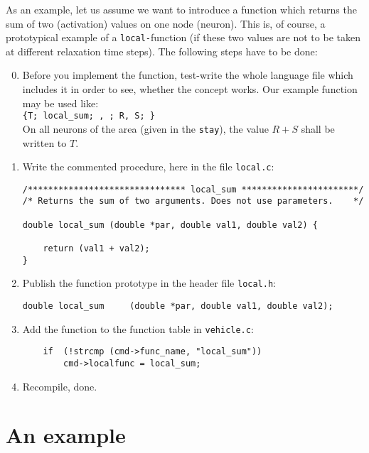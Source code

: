 \documentclass[12pt]{article}
\begin{document}
 As an example, let us assume we want to introduce a function which returns the sum of two (activation) values on one node (neuron).
 This is, of course, a prototypical example of a \texttt{local-}function
 (if these two values are not to be taken at different relaxation time steps).
 The following steps have to be done:

 \begin{enumerate}
 \setcounter{enumi}{-1}
 \item Before you implement the function,
 test-write the whole language file which includes it in order to see, whether the concept works.
 Our example function may be used like: \\
 \hspace*{11mm} \texttt{\{T; local\_sum; , ; R, S; \}} \\
 On all neurons of the area (given in the \texttt{stay}), the value $R + S$ shall be written to $T$.

 \item Write the commented procedure, here in the file \texttt{local.c}:
 \begin{verbatim}
/******************************* local_sum ***********************/
/* Returns the sum of two arguments. Does not use parameters.    */

double local_sum (double *par, double val1, double val2) {

    return (val1 + val2);
}
 \end{verbatim}

 \item Publish the function prototype in the header file \texttt{local.h}:
 \begin{verbatim}
double local_sum     (double *par, double val1, double val2);
 \end{verbatim}

 \item Add the function to the function table in \texttt{vehicle.c}:
 \begin{verbatim}
    if  (!strcmp (cmd->func_name, "local_sum"))
        cmd->localfunc = local_sum;
 \end{verbatim}

 \item Recompile, done.

 \end{enumerate}


\section{An example}
\end{document}
